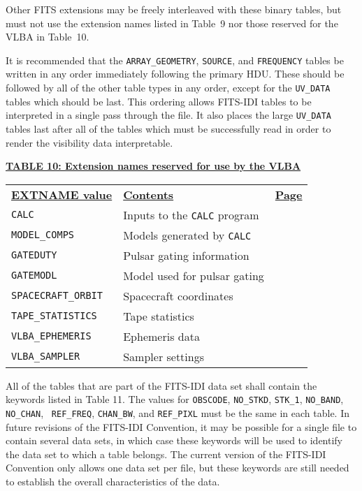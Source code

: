 \documentclass[twoside]{article}
\newcommand{\Hi}[1]{\textcolor{hicol}{#1}}
\begin{document}
Other FITS extensions may be freely interleaved with these binary
tables, but \Hi{must not use the extension names listed in Table~9 nor
those reserved for the VLBA in Table~10.}

\Hi{It is recommended that the {\tt ARRAY\_GEOMETRY}, {\tt SOURCE},
  and {\tt FREQUENCY} tables be written in any order immediately
  following the primary HDU\@.  These should be followed by all of the
  other table types in any order, except for the {\tt UV\_DATA} tables
  which should be last.  This ordering allows FITS-IDI tables to be
  interpreted in a single pass through the file.  It also places the
  large {\tt UV\_DATA} tables last after all of the tables which must
  be successfully read in order to render the visibility data
  interpretable.}

\vfill\eject
\begin{center}
\underline{\bf{TABLE 10: Extension names reserved for use by the VLBA}}\\
\begin{tabular}{llr}
\noalign{\vspace{2pt}}
\underline{{\bf EXTNAME value\vphantom{y}}} &
   \underline{\bf{Contents\vphantom{y}}} & \underline{\bf{Page}} \\
\noalign{\vspace{2pt}}
{\tt CALC}              & Inputs to the {\tt CALC} program \\
{\tt MODEL\_COMPS}      & Models generated by {\tt CALC} & \Hi{\pageref{s:MC}} \\
{\tt GATEDUTY}          & Pulsar gating information \\
{\tt GATEMODL}          & Model used for pulsar gating \\
{\tt SPACECRAFT\_ORBIT} & Spacecraft coordinates \\
{\tt TAPE\_STATISTICS}  & Tape statistics \\
{\tt VLBA\_EPHEMERIS}   & Ephemeris data \\
{\tt VLBA\_SAMPLER}     & Sampler settings
\end{tabular}
\end{center}

All of the tables that are part of the FITS-IDI data set shall contain
the keywords listed in Table \Hi{11}.  The values for {\tt OBSCODE},
{\tt NO\_STKD}, {\tt STK\_1}, {\tt NO\_BAND}, {\tt NO\_CHAN}, {\tt
REF\_FREQ}, {\tt CHAN\_BW}, and {\tt REF\_PIXL} must be the same in
each table.  In future revisions of the FITS-IDI \Hi{Convention}, it
may be possible for a single file to contain several data sets, in
which case these keywords will be used to identify the data set to
which a table belongs.  The current version of the FITS-IDI
\Hi{Convention} only allows one data set per file, but these keywords
are still needed to establish the overall characteristics of the data.
\end{document}
